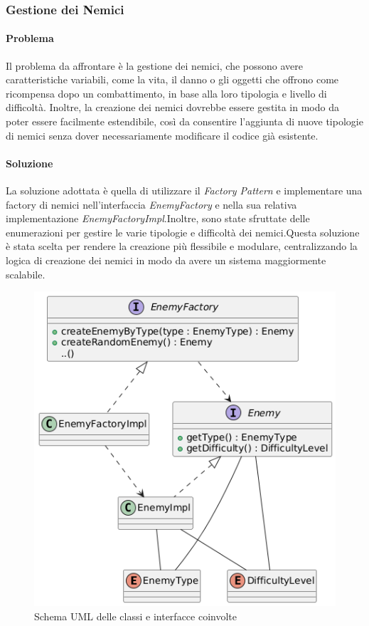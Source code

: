 \documentclass[a4paper,12pt]{report}
\begin{document}
\subsubsection{Gestione dei Nemici}

\paragraph{Problema} Il problema da affrontare è la gestione dei nemici, che possono avere caratteristiche variabili, come
la vita, il danno o gli oggetti che offrono come ricompensa dopo un combattimento, in base alla loro tipologia e livello di difficoltà.
Inoltre, la creazione dei nemici dovrebbe essere gestita in modo da poter essere facilmente estendibile, così da consentire l'aggiunta
di nuove tipologie di nemici senza dover necessariamente modificare il codice già esistente.
\paragraph{Soluzione} La soluzione adottata è quella di utilizzare il \textit{Factory Pattern} e implementare una factory di nemici nell'interfaccia
\textit{EnemyFactory} e nella sua relativa implementazione \textit{EnemyFactoryImpl}.\newline Inoltre, sono state sfruttate delle enumerazioni per
gestire le varie tipologie e difficoltà dei nemici.\newline Questa soluzione è stata scelta per rendere la creazione più flessibile e modulare, centralizzando
la logica di creazione dei nemici in modo da avere un sistema maggiormente scalabile.\newline

\begin{figure}[H]
	\centering
	\includegraphics[width=\textwidth]{img/EnemyUML.png}
	\caption{Schema UML delle classi e interfacce coinvolte}
	\label{img:EnemyUML}
\end{figure}
\end{document}
